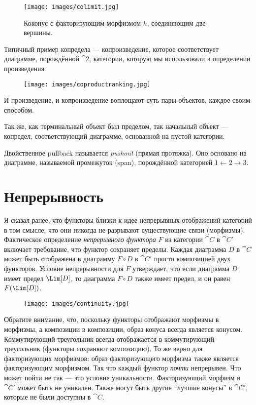 \begin{figure}[H]
  \centering
  \texttt{[image: images/colimit.jpg]}
  \caption{Коконус с факторизующим морфизмом $h$, соединяющим две вершины.}
\end{figure}

\noindent
Типичный пример копредела --- копроизведение, которое соответствует
диаграмме, порождённой $\cat{2}$, категории, которую мы использовали в
определении произведения.

\begin{figure}[H]
  \centering
  \texttt{[image: images/coproductranking.jpg]}
\end{figure}

\noindent
И произведение, и копроизведение воплощают суть пары
объектов, каждое своим способом.

Так же, как терминальный объект был пределом, так начальный объект ---
копредел, соответствующий диаграмме, основанной на пустой категории.

Двойственное pullback называется \emph{pushout} (прямая протяжка). Оно основано на
диаграмме, называемой промежуток (span), порождённой категорией
$1\leftarrow2\rightarrow3$.

\section{Непрерывность}

Я сказал ранее, что функторы близки к идее непрерывных
отображений категорий в том смысле, что они никогда не разрывают существующие
связи (морфизмы). Фактическое определение \emph{непрерывного
  функтора} $F$ из категории $\cat{C}$ в $\cat{C'}$ включает
требование, что функтор сохраняет пределы. Каждая диаграмма $D$
в $\cat{C}$ может быть отображена в диаграмму $F \circ D$ в $\cat{C'}$
просто композицией двух функторов. Условие непрерывности для $F$
утверждает, что если диаграмма $D$ имеет предел $\Lim[D]$, то
диаграмма $F \circ D$ также имеет предел, и он равен
$F (\Lim[D])$.

\begin{figure}[H]
  \centering
  \texttt{[image: images/continuity.jpg]}
\end{figure}

\noindent
Обратите внимание, что, поскольку функторы отображают морфизмы в морфизмы, а
композиции в композиции, образ конуса всегда является конусом.
Коммутирующий треугольник всегда отображается в коммутирующий треугольник (функторы
сохраняют композицию). То же верно для факторизующих морфизмов:
образ факторизующего морфизма также является факторизующим морфизмом. Так что
каждый функтор \emph{почти} непрерывен. Что может пойти не так --- это
условие уникальности. Факторизующий морфизм в $\cat{C'}$ может быть не
уникален. Также могут быть другие ``лучшие конусы'' в $\cat{C'}$, которые не были
доступны в $\cat{C}$.

